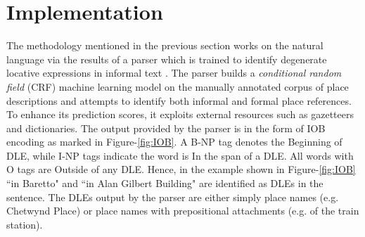 \documentclass{acm_proc_article-sp}
\begin{document}


\section{Implementation}
The methodology mentioned in the previous section works on the natural language via the results of a parser which is trained to identify degenerate locative expressions in informal text \cite{fei:locative}. 
The parser builds a \textit{conditional random field} (CRF) machine learning model on the manually annotated corpus of place descriptions \cite{tuw} and attempts to identify both informal and formal place references. To enhance its prediction scores, it exploits external resources such as gazetteers and dictionaries. The output provided by the parser is in the form of IOB encoding as marked in Figure-\ref{fig:IOB}. A B-NP tag denotes the Beginning of DLE, while I-NP tags indicate the word is In the span of a DLE. All words with O tags are Outside of any DLE. Hence, in the example shown in Figure-\ref{fig:IOB}  ``in Baretto" and ``in Alan Gilbert Building" are identified as DLEs in the sentence. The DLEs output by the parser are either simply place names (e.g. Chetwynd Place) or place names with prepositional attachments (e.g. of the train station).
\end{document}
